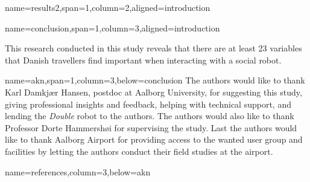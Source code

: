 \documentclass[paperwidth=160cm,paperheight=100cm,landscape,fontscale=0.2941]{baposter}
\begin{document}
\begin{poster}
{name=results2,span=1,column=2,aligned=introduction}
{\parskip 5pt


}


{name=conclusion,span=1,column=3,aligned=introduction}
{\parskip 5pt
This research conducted in this study reveals that there are at least 23 variables that Danish travellers find important when interacting with a social robot. 


}


{name=akn,span=1,column=3,below=conclusion}
{\parskip 5pt
The authors would like to thank Karl Damkjær Hansen, postdoc at Aalborg University, for suggesting this study, giving professional insights and feedback, helping with technical support, and lending the \textit{Double} robot to the authors.
The authors would also like to thank Professor Dorte Hammershøi for supervising the study. 
Last the authors would like to thank Aalborg Airport for providing access to the wanted user group and facilities by letting the authors conduct their field studies at the airport. 
}


{name=references,column=3,below=akn}
{
\renewcommand{\section}[2]{}%
\footnotesize
}



\end{poster}
\end{document}
